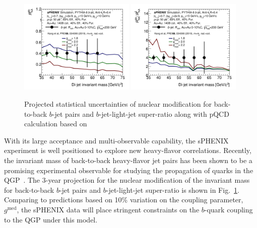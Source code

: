 \begin{figure}[htbp]
\centering
\includegraphics[width=0.49\textwidth]{figs/200pp_pythia8_CTEQ6L_7GeV_ALL_cfg_eneg_DSTReader_root_Draw_HFJetTruth_InvMass_CrossSection2RAA_Theory_3yr_deta0_70.pdf}
\includegraphics[width=0.49\textwidth]{figs/200pp_pythia8_CTEQ6L_7GeV_ALL_cfg_eneg_DSTReader_root_Draw_HFJetTruth_InvMass_CrossSection2RAARatio_Theory_3yr_deta0_70.pdf}
\caption{Projected statistical uncertainties of nuclear modification for back-to-back $b$-jet pairs and $b$-jet-light-jet super-ratio along with pQCD calculation based on~\cite{Kang:2018wrs}
}
\label{fig:HF-bjet-pair}
\end{figure}

With its large acceptance and multi-observable capability, the sPHENIX
experiment is well positioned to explore new heavy-flavor
correlations. Recently, the invariant mass of back-to-back
heavy-flavor jet pairs has been shown to be a promising experimental
observable for studying the propagation of quarks in the
QGP~\cite{Kang:2018wrs}. The 3-year projection for the nuclear
modification of the invariant mass for back-to-back $b$-jet pairs and
$b$-jet-light-jet super-ratio is shown in
Fig.~\ref{fig:HF-bjet-pair}. Comparing to predictions based on 10\%
variation on the coupling parameter, $g^{\textrm{med}}$, the sPHENIX
data will place stringent constraints on the $b$-quark coupling to the
QGP under this model.



